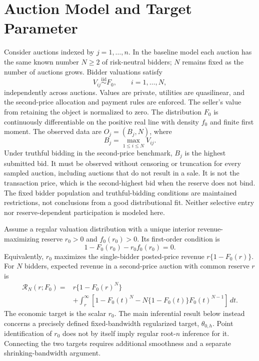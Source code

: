 \section{Auction Model and Target Parameter}

Consider auctions indexed by $j=1,\ldots,n$. In the baseline model each auction
has the same known number $N\geq2$ of risk-neutral bidders; $N$ remains fixed
as the number of auctions grows. Bidder
valuations satisfy
\begin{equation}
V_{ij}\overset{\mathrm{iid}}{\sim}F_0,
\qquad i=1,\ldots,N,
\end{equation}
independently across auctions. Values are private, utilities are quasilinear,
and the second-price allocation and payment rules are enforced. The seller's
value from retaining the object is normalized to zero. The distribution $F_0$
is continuously differentiable on the positive real line with density $f_0$
and finite first moment. The observed data
are $O_j=(B_j,N)$, where
\begin{equation}
B_j=\max_{1\leq i\leq N}V_{ij}.
\end{equation}
Under truthful bidding in the second-price benchmark, $B_j$ is the highest
submitted bid. It must be observed without censoring or truncation for every
sampled auction, including auctions that do not result in a sale. It is not
the transaction price, which is the second-highest bid when the reserve does
not bind. The fixed bidder population and truthful-bidding conditions are
maintained restrictions, not conclusions from a good distributional fit.
Neither selective entry nor reserve-dependent participation is modeled here.

Assume a regular valuation distribution with a unique interior
revenue-maximizing reserve $r_0>0$ and $f_0(r_0)>0$. Its first-order condition is
\begin{equation}
1-F_0(r_0)-r_0 f_0(r_0)=0.
\end{equation}
Equivalently, $r_0$ maximizes the single-bidder posted-price revenue
$r\{1-F_0(r)\}$. For $N$ bidders, expected revenue in a second-price auction
with common reserve $r$ is
\begin{align}
\mathcal R_N(r;F_0)
={}&r\{1-F_0(r)^N\}\\
&+\int_r^\infty
\left[1-F_0(t)^N-N\{1-F_0(t)\}F_0(t)^{N-1}\right]\,dt.
\end{align}
The economic target is the scalar $r_0$. The main inferential result below
instead concerns a precisely defined fixed-bandwidth regularized target,
$\theta_{0,h}$. Point identification of $r_0$ does not by itself imply regular
root-$n$ inference for it. Connecting the two targets requires additional
smoothness and a separate shrinking-bandwidth argument.

